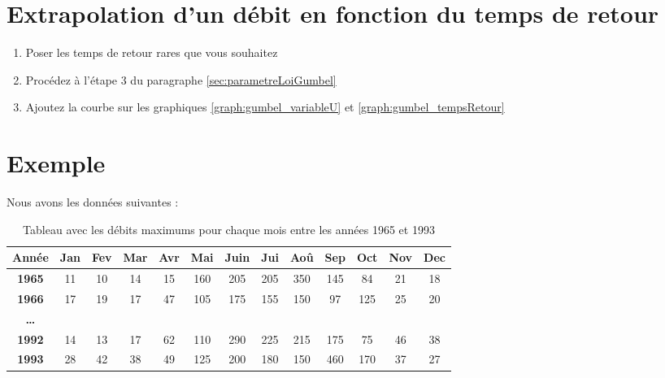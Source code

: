 \section{Extrapolation d'un débit en fonction du temps de retour}
\begin{enumerate}
    \item Poser les temps de retour rares que vous souhaitez
    \item Procédez à l'étape 3 du paragraphe \ref{sec:parametreLoiGumbel}
    \item Ajoutez la courbe sur les graphiques \ref{graph:gumbel_variableU} et \ref{graph:gumbel_tempsRetour}
\end{enumerate}

\section{Exemple}
Nous avons les données suivantes :
\begin{table}[H]
    \centering
    \begin{tabular}{|c||c|c|c|c|c|c|c|c|c|c|c|c|}
        \hline
        \textbf{Année} & \textbf{Jan} & \textbf{Fev} & \textbf{Mar} & \textbf{Avr} & \textbf{Mai} & \textbf{Juin} & \textbf{Jui} & \textbf{Aoû} & \textbf{Sep} & \textbf{Oct} & \textbf{Nov} & \textbf{Dec} \\
        \hline \hline
        \textbf{1965}  & 11 & \cellcolor{green}10 & 14 & 15 & 160 & 205 & 205 & \cellcolor{red}350 & 145 &  84 &  21 & 18 \\
        \hline
        \textbf{1966}  & \cellcolor{green}17 & 19 & 17 & 47 & 105 & \cellcolor{red}175 & 155 & 150 &  97 & 125 &  25 & 20 \\
        \hline
        \textbf{\dots} &    &    &    &    &     &     &     &     &       &     &     &      \\
        \hline
        \textbf{1992}  & 14 & \cellcolor{green}13 & 17 & 62 & 110 & \cellcolor{red}290 & 225 & 215 & 175 &  75 &  46 & 38 \\
        \hline
        \textbf{1993}  & 28 & 42 & 38 & 49 & 125 & 200 & 180 & 150 & \cellcolor{red}460 & 170 &  37 & \cellcolor{green}27 \\
        \hline
    \end{tabular}
    \caption{Tableau avec les débits maximums pour chaque mois entre les années 1965 et 1993}
    \label{tab:seriesAnnuellesMaximum}
\end{table}

